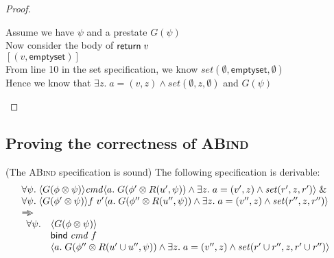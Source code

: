 \begin{proof}
\begin{tabbedproof}
\oo Assume we have $\psi$ and a prestate $G(\psi)$ \\
\oo Now consider the body of $\mathsf{return}\; v$ \\
\oo $[(v, \mathsf{emptyset})]$ \\
\oo From line 10 in the set specification, we know $\mathit{set}(\emptyset, \mathsf{emptyset}, \emptyset)$ \\
\oo Hence we know that $\exists z.\; a = (v, z) \land \mathit{set}(\emptyset, z, \emptyset)$ and $G(\psi)$ \\
\end{tabbedproof}
\end{proof}

\subsection{Proving the correctness of \textsc{ABind}}

\begin{prop*}{(The \textsc{ABind} specification is sound)}
The following specification is derivable:
\begin{displaymath}
\begin{array}{l}
\forall \psi.\; \langle{G(\phi \otimes \psi)}\rangle{\mathit{cmd}}\langle{a}.\;{G(\phi' \otimes R(u', \psi)) \land \exists z.\;a = (v', z) \land \mathit{set}(r', z, r')}\rangle 
                \;\&\; \\
\forall \psi.\; \langle{G(\phi' \otimes \psi)}\rangle{f\;v'}\langle{a}.\;{G(\phi'' \otimes R(u'', \psi)) \land \exists z.\; a = (v'', z) \land \mathit{set}(r'', z, r'')}\rangle\\
\Rightarrow\!\!\!> \\
\begin{array}{ll}
     \forall \psi. & \left<G(\phi \otimes \psi)\right> \\
                   & \mathsf{bind}\; \mathit{cmd}\;f \\
                   &  \left<a.\;G(\phi'' \otimes R(u' \cup u'', \psi)) \land \exists z.\;a = (v'', z) \land \mathit{set}(r' \cup r'', z, r' \cup r'')\right> \\
   \end{array}
\end{array}
\end{displaymath}
\end{prop*}

